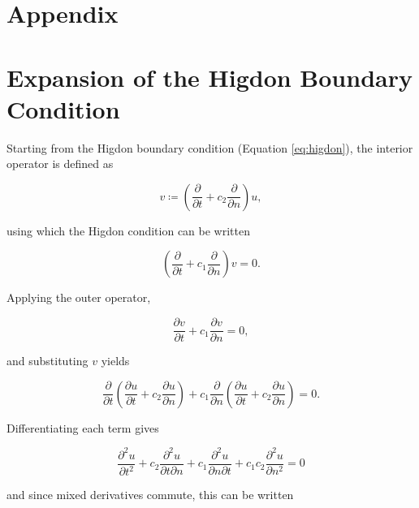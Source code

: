 \documentclass[final-report]{report-template}
\begin{document}

 

\newpage
\appendix
\section*{Appendix}

\section{Expansion of the Higdon Boundary Condition}
\label{app:hig_exp}

Starting from the Higdon boundary condition (Equation \eqref{eq:higdon}), the interior operator is defined as

\begin{equation}
    v \coloneqq \left( \frac{\partial}{\partial t} + c_2 \frac{\partial}{\partial n} \right)u,
\end{equation}

using which the Higdon condition can be written

\begin{equation}
    \left( \frac{\partial}{\partial t} + c_1 \frac{\partial}{\partial n} \right)v = 0.
\end{equation}

Applying the outer operator,

\begin{equation}
    \frac{\partial v}{\partial t} + c_1 \frac{\partial v}{\partial n} = 0,
\end{equation}

and substituting $v$ yields

\begin{equation}
    \frac{\partial}{\partial t} \left( \frac{\partial u}{\partial t} + c_2 \frac{\partial u}{\partial n} \right) +
    c_1 \frac{\partial}{\partial n} \left( \frac{\partial u}{\partial t} + c_2 \frac{\partial u}{\partial n} \right) = 0.
\end{equation}

Differentiating each term gives

\begin{equation}
    \frac{\partial^2 u}{\partial t^2} + 
    c_2 \frac{\partial^2 u}{\partial t \partial n } + 
    c_1\frac{\partial^2 u}{\partial n \partial t} +
    c_1 c_2 \frac{\partial^2 u}{\partial n^2} = 0
\end{equation}

and since mixed derivatives commute, this can be written
\end{document}
